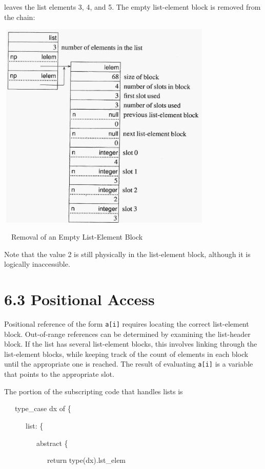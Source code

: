 \noindent leaves the list elements 3, 4, and 5. The empty list-element
block is removed from the chain:

 \includegraphics[width=4.0602in,height=3.9307in]{ib-img/ib-img032.jpg} 


\ \ Removal of an Empty List-Element Block


Note that the value 2 is still physically in the list-element block,
although it is logically inaccessible.

\section[6.3 Positional Access]{6.3 Positional Access}

Positional reference of the form \texttt{a[i]} requires locating the
correct list-element block. Out-of-range references can be determined
by examining the list-header block. If the list has several
list-element blocks, this involves linking through the list-element
blocks, while keeping track of the count of elements in each block
until the appropriate one is reached. The result of evaluating
\texttt{a[i]} is a variable that points to the appropriate slot.

The portion of the subscripting code that handles lists is

{\ttfamily\mdseries
\ \ \ type\_case dx of \{}

{\ttfamily\mdseries
\ \ \ \ \ \ list: \{}

{\ttfamily\mdseries
\ \ \ \ \ \ \ \ \ abstract \{}

{\ttfamily\mdseries
\ \ \ \ \ \ \ \ \ \ \ \ return type(dx).lst\_elem}

